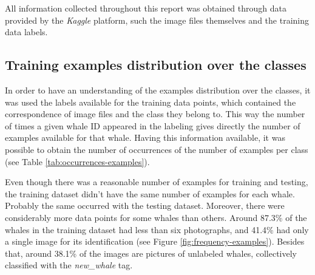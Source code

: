 \documentclass[12pt,
    brazil,			%
	english,        %
	]{article}
\begin{document}
All information collected throughout this report was obtained through data provided by the \textit{Kaggle} platform, such the image files themselves and the training data labels.

\subsection{Training examples distribution over the classes}

In order to have an understanding of the examples distribution over the classes, it was used the labels available for the training data points, which contained the correspondence of image files and the class they belong to. This way the number of times a given whale ID appeared in the labeling gives directly the number of examples available for that whale. Having this information available, it was possible to obtain the number of occurrences of the number of examples per class (see Table \ref{tab:occurrences-examples}).

Even though there was a reasonable number of examples for training and testing, the training dataset didn't have the same number of examples for each whale. Probably the same occurred with the testing dataset. Moreover, there were considerably more data points for some whales than others. Around 87.3\% of the whales in the training dataset had less than six photographs, and 41.4\% had only a single image for its identification (see Figure \ref{fig:frequency-examples}). Besides that, around 38.1\% of the images are pictures of unlabeled whales, collectively classified with the \textit{new\_whale} tag. 
\end{document}
